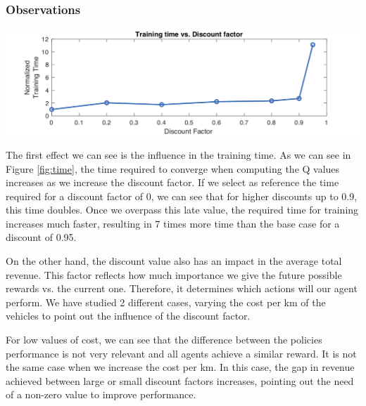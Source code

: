 \documentclass[11pt]{article}
\begin{document}
\subsubsection{Observations}


\begin{minipage}[]{\textwidth}

\begin{minipage}[]{0.48\textwidth}
\includegraphics[width=\textwidth]{2-reactive/doc/plots/time-discount-2.png}
\label{fig:time}
\end{minipage}
\hfill
\begin{minipage}[]{0.5\textwidth}
The first effect we can see is the influence in the training time. As we can see in Figure \ref{fig:time}, the time required to converge when computing the Q values increases as we increase the discount factor. If we select as reference the time required for a discount factor of 0, we can see that for higher discounts up to 0.9, this time doubles. Once we overpass this late value, the required time for training increases much faster, resulting in 7 times more time than the base case for a discount of 0.95. \\
\end{minipage}

\end{minipage}



On the other hand, the discount value also has an impact in the average total revenue. This factor reflects how much importance we give the future possible rewards vs. the current one. Therefore, it determines which actions will our agent perform. We have studied 2 different cases, varying the cost per km of the vehicles to point out the influence of the discount factor. 

For low values of cost, we can see that the difference between the policies performance is not very relevant and all agents achieve a similar reward. It is not the same case when we increase the cost per km. In this case, the gap in revenue achieved between large or small discount factors increases, pointing out the need of a non-zero value to improve performance. 
\end{document}

